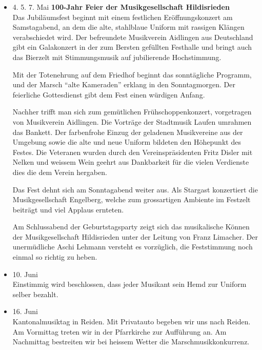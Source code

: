 \begin{history}
\begin{itemize}
        \item[]4. 5. 7. Mai \textbf{100-Jahr Feier der Musikgesellschaft
            Hildisrieden}\\
        Das Jubiläumsfest beginnt mit einem festlichen Eröffnungskonzert am
        Samstagabend, an dem die alte, stahlblaue Uniform mit rassigen Klängen
        verabschiedet wird. Der befreundete Musikverein Aidlingen aus
        Deutschland gibt ein Galakonzert in der zum Bersten gefüllten Festhalle
        und bringt auch  das Bierzelt mit Stimmungsmusik auf jubilierende
        Hochstimmung.

        Mit der Totenehrung auf dem Friedhof beginnt das sonntägliche Programm,
        und der Marsch \enquote{alte Kameraden} erklang in den Sonntagmorgen.
        Der feierliche Gottesdienst gibt dem Fest einen würdigen Anfang.

        Nachher trifft man sich zum gemütlichen Frühschoppenkonzert, vorgetragen
        von Musikverein Aidlingen. Die Vorträge der Stadtmusik Laufen umrahmen
        das Bankett. Der farbenfrohe Einzug der geladenen Musikvereine aus der
        Umgebung sowie die alte und neue Uniform bildeten den Höhepunkt des
        Festes. Die Veteranen wurden durch den Vereinspräsidenten Fritz Disler
        mit Nelken und weissem Wein geehrt aus Dankbarkeit für die vielen
        Verdienste dies die dem Verein hergaben.

        Das Fest dehnt sich am Sonntagabend weiter aus. Als Stargast konzertiert
        die Musikgesellschaft Engelberg, welche zum grossartigen Ambiente im
        Festzelt beiträgt und viel Applaus ernteten.

        Am Schlussabend der Geburtstagsparty zeigt sich das musikalische Können
        der Musikgesellschaft Hildisrieden unter der Leitung von Franz Limacher.
        Der unermüdliche Aschi Lehmann versteht es vorzüglich, die Feststimmung
        noch einmal so richtig zu heben.

        \item[]10. Juni\\
        Einstimmig wird beschlossen, dass jeder Musikant sein Hemd zur Uniform
        selber bezahlt.

        \item[]16. Juni\\
        Kantonalmusiktag in Reiden. Mit Privatauto begeben wir uns nach Reiden.
        Am Vormittag treten wir in der Pfarrkirche zur Aufführung an. Am
        Nachmittag bestreiten wir bei heissem Wetter die Marschmusikkonkurrenz.


\end{itemize}
\end{history}
